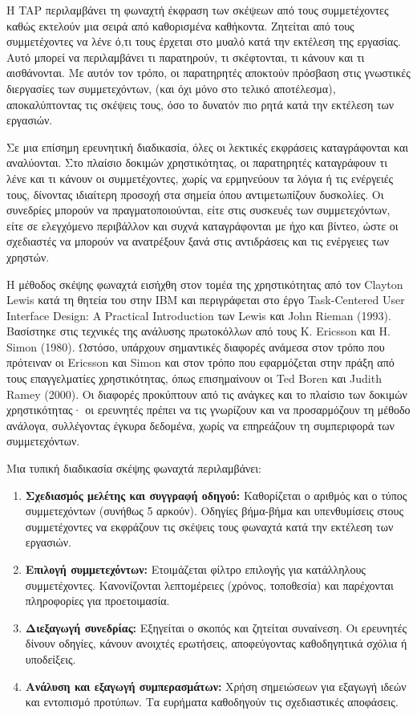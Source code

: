 \documentclass[
	12pt, %
	oneside, %
	greek,
	onehalfspacing, %
	liststotoc, %
	toctotoc, %
	parskip, %
	headsepline, %
]{MastersDoctoralThesis} %
\begin{document}
Η TAP περιλαμβάνει τη φωναχτή έκφραση των σκέψεων από τους συμμετέχοντες καθώς εκτελούν μια σειρά από καθορισμένα καθήκοντα. Ζητείται από τους συμμετέχοντες να λένε ό,τι τους έρχεται στο μυαλό κατά την εκτέλεση της εργασίας. Αυτό μπορεί να περιλαμβάνει τι παρατηρούν, τι σκέφτονται, τι κάνουν και τι αισθάνονται. Με αυτόν τον τρόπο, οι παρατηρητές αποκτούν πρόσβαση στις γνωστικές διεργασίες των συμμετεχόντων, (και όχι μόνο στο τελικό αποτέλεσμα), αποκαλύπτοντας τις σκέψεις τους, όσο το δυνατόν πιο ρητά κατά την εκτέλεση των εργασιών.

Σε μια επίσημη ερευνητική διαδικασία, όλες οι λεκτικές εκφράσεις καταγράφονται και αναλύονται. Στο πλαίσιο δοκιμών χρηστικότητας, οι παρατηρητές καταγράφουν τι λένε και τι κάνουν οι συμμετέχοντες, χωρίς να ερμηνεύουν τα λόγια ή τις ενέργειές τους, δίνοντας ιδιαίτερη προσοχή στα σημεία όπου αντιμετωπίζουν δυσκολίες. Οι συνεδρίες μπορούν να πραγματοποιούνται, είτε στις συσκευές των συμμετεχόντων, είτε σε ελεγχόμενο περιβάλλον και συχνά καταγράφονται με ήχο και βίντεο, ώστε οι σχεδιαστές να μπορούν να ανατρέξουν ξανά στις αντιδράσεις και τις ενέργειες των χρηστών.

Η μέθοδος σκέψης φωναχτά εισήχθη στον τομέα της χρηστικότητας από τον Clayton Lewis κατά τη θητεία του στην IBM και περιγράφεται στο έργο Task-Centered User Interface Design: A Practical Introduction των Lewis και John Rieman (1993). Βασίστηκε στις τεχνικές της ανάλυσης πρωτοκόλλων από τους K. Ericsson και H. Simon (1980). Ωστόσο, υπάρχουν σημαντικές διαφορές ανάμεσα στον τρόπο που πρότειναν οι Ericsson και Simon και στον τρόπο που εφαρμόζεται στην πράξη από τους επαγγελματίες χρηστικότητας, όπως επισημαίνουν οι Ted Boren και Judith Ramey (2000). Οι διαφορές προκύπτουν από τις ανάγκες και το πλαίσιο των δοκιμών χρηστικότητας· οι ερευνητές πρέπει να τις γνωρίζουν και να προσαρμόζουν τη μέθοδο ανάλογα, συλλέγοντας έγκυρα δεδομένα, χωρίς να επηρεάζουν τη συμπεριφορά των συμμετεχόντων.

Μια τυπική διαδικασία σκέψης φωναχτά περιλαμβάνει:

\begin{enumerate}
    \item \textbf{Σχεδιασμός μελέτης και συγγραφή οδηγού:} Καθορίζεται ο αριθμός και ο τύπος συμμετεχόντων (συνήθως 5 αρκούν). Οδηγίες βήμα-βήμα και υπενθυμίσεις στους συμμετέχοντες να εκφράζουν τις σκέψεις τους φωναχτά κατά την εκτέλεση των εργασιών.
    \item \textbf{Επιλογή συμμετεχόντων:} Ετοιμάζεται φίλτρο επιλογής για κατάλληλους συμμετέχοντες. Κανονίζονται λεπτομέρειες (χρόνος, τοποθεσία) και παρέχονται πληροφορίες για προετοιμασία.
    \item \textbf{Διεξαγωγή συνεδρίας:} Εξηγείται ο σκοπός και ζητείται συναίνεση. Οι ερευνητές δίνουν οδηγίες, κάνουν ανοιχτές ερωτήσεις, αποφεύγοντας καθοδηγητικά σχόλια ή υποδείξεις.
    \item \textbf{Ανάλυση και εξαγωγή συμπερασμάτων:} Χρήση σημειώσεων για εξαγωγή ιδεών και εντοπισμό προτύπων. Τα ευρήματα καθοδηγούν τις σχεδιαστικές αποφάσεις.
\end{enumerate}
\end{document}
